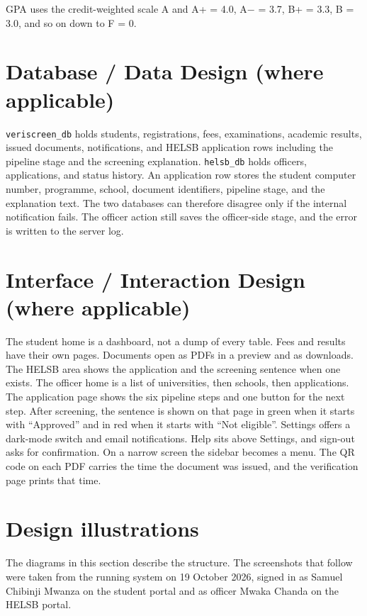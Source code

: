 \documentclass[12pt,a4paper]{report}
\begin{document}
GPA uses the credit-weighted scale A and A+ = 4.0, A$-$ = 3.7, B+ = 3.3, B = 3.0, and so on down to F = 0.

\section{Database / Data Design (where applicable)}
\texttt{veriscreen\_db} holds students, registrations, fees, examinations, academic results, issued documents, notifications, and HELSB application rows including the pipeline stage and the screening explanation. \texttt{helsb\_db} holds officers, applications, and status history. An application row stores the student computer number, programme, school, document identifiers, pipeline stage, and the explanation text. The two databases can therefore disagree only if the internal notification fails. The officer action still saves the officer-side stage, and the error is written to the server log.

\section{Interface / Interaction Design (where applicable)}
The student home is a dashboard, not a dump of every table. Fees and results have their own pages. Documents open as PDFs in a preview and as downloads. The HELSB area shows the application and the screening sentence when one exists. The officer home is a list of universities, then schools, then applications. The application page shows the six pipeline steps and one button for the next step. After screening, the sentence is shown on that page in green when it starts with ``Approved'' and in red when it starts with ``Not eligible''. Settings offers a dark-mode switch and email notifications. Help sits above Settings, and sign-out asks for confirmation. On a narrow screen the sidebar becomes a menu. The QR code on each PDF carries the time the document was issued, and the verification page prints that time.

\section{Design illustrations}
The diagrams in this section describe the structure. The screenshots that follow were taken from the running system on 19 October 2026, signed in as Samuel Chibinji Mwanza on the student portal and as officer Mwaka Chanda on the HELSB portal.
\end{document}
